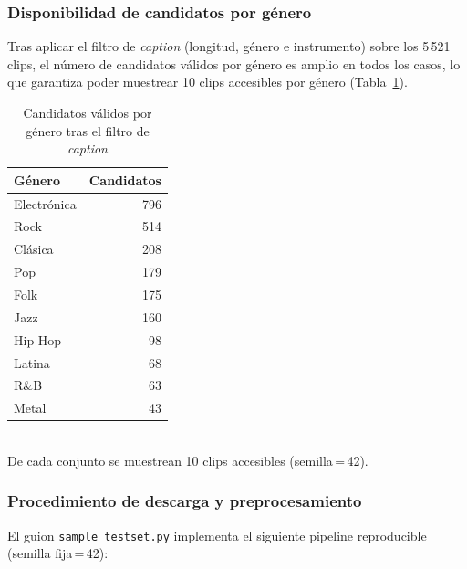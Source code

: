 \subsubsection{Disponibilidad de candidatos por género}

Tras aplicar el filtro de \textit{caption} (longitud, género e instrumento)
sobre los 5\,521 clips, el número de candidatos válidos por género es amplio
en todos los casos, lo que garantiza poder muestrear 10 clips accesibles por
género (Tabla~\ref{tab:candidatos}).

\begin{table}[t]
  \caption{Candidatos válidos por género tras el filtro de \textit{caption}}
  \label{tab:candidatos}
  \centering
  \begin{tabular}{lr}
    \hline
    \textbf{Género} & \textbf{Candidatos} \\
    \hline
    Electrónica & 796 \\
    Rock        & 514 \\
    Clásica     & 208 \\
    Pop         & 179 \\
    Folk        & 175 \\
    Jazz        & 160 \\
    Hip-Hop     & 98 \\
    Latina      & 68 \\
    R\&B        & 63 \\
    Metal       & 43 \\
    \hline
  \end{tabular}
  \smallskip\\
  \footnotesize{De cada conjunto se muestrean 10 clips accesibles
  (semilla\,=\,42).}
\end{table}

\subsubsection{Procedimiento de descarga y preprocesamiento}

El guion \texttt{sample\_testset.py} implementa el siguiente pipeline
reproducible (semilla fija\,=\,42):


